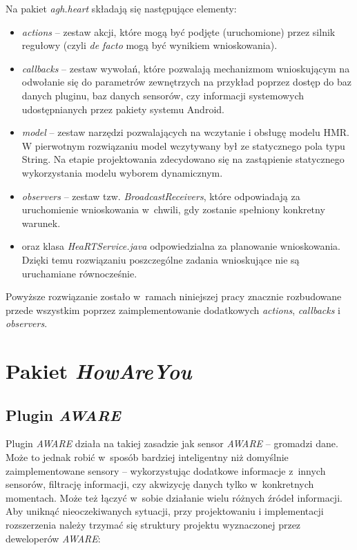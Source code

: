 Na pakiet \textit{agh.heart} składają się następujące elementy:
\begin{itemize}
	\item \textit{actions} -- zestaw akcji, które mogą być podjęte (uruchomione) przez silnik regułowy (czyli \textit{de facto} mogą być wynikiem wnioskowania).
	
	\item \textit{callbacks} -- zestaw wywołań, które pozwalają mechanizmom wnioskującym na odwołanie się do parametrów zewnętrzych na przykład poprzez dostęp do baz danych pluginu, baz danych sensorów, czy informacji systemowych udostępnianych przez pakiety systemu Android.
	
	\item \textit{model} -- zestaw narzędzi pozwalających na wczytanie i obsługę modelu HMR. W pierwotnym rozwiązaniu model wczytywany był ze statycznego pola typu String. Na etapie projektowania zdecydowano się na zastąpienie statycznego wykorzystania modelu wyborem dynamicznym.
	
	\item \textit{observers} -- zestaw tzw. \textit{BroadcastReceivers}, które odpowiadają za uruchomienie wnioskowania w~chwili, gdy zostanie spełniony konkretny warunek.
	
	\item oraz klasa \textit{HeaRTService.java} odpowiedzialna za planowanie wnioskowania. Dzięki temu rozwiązaniu poszczególne zadania wnioskujące nie są uruchamiane równocześnie\cite{heartaware}.
\end{itemize}

Powyższe rozwiązanie zostało w~ramach niniejszej pracy znacznie rozbudowane przede wszystkim poprzez zaimplementowanie dodatkowych \textit{actions}, \textit{callbacks} i \textit{observers}.



\section{Pakiet \textit{HowAreYou}}
\label{sec:pakietHowAreYou}


\subsection{Plugin \textit{AWARE}}

Plugin \textit{AWARE} działa na takiej zasadzie jak sensor \textit{AWARE} -- gromadzi dane. Może to jednak robić w~sposób bardziej inteligentny niż domyślnie zaimplementowane sensory -- wykorzystując dodatkowe informacje z~innych sensorów, filtrację informacji, czy akwizycję danych tylko w~konkretnych momentach. Może też łączyć w~sobie działanie wielu różnych źródeł informacji. Aby uniknąć nieoczekiwanych sytuacji, przy projektowaniu i implementacji rozszerzenia należy trzymać się struktury projektu wyznaczonej przez deweloperów \textit{AWARE}:

